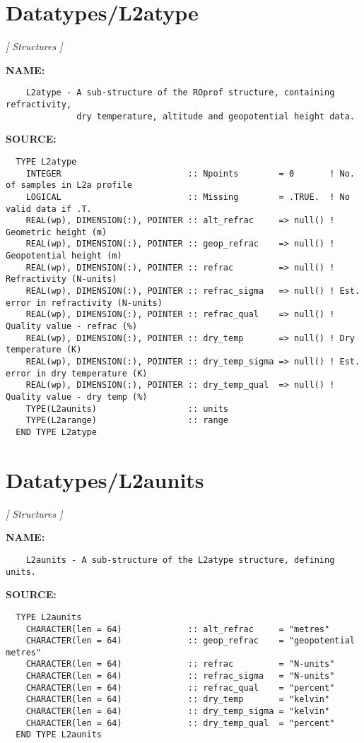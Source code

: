 \section{Datatypes/L2atype}
\textsl{[ Structures ]}

\label{ch:robo38}
\label{ch:Datatypes_L2atype}
\textbf{NAME:}\hspace{0.08in}\begin{Verbatim}
    L2atype - A sub-structure of the ROprof structure, containing refractivity, 
              dry temperature, altitude and geopotential height data.
\end{Verbatim}
\textbf{SOURCE:}\hspace{0.08in}\begin{Verbatim}
  TYPE L2atype
    INTEGER                         :: Npoints        = 0       ! No. of samples in L2a profile
    LOGICAL                         :: Missing        = .TRUE.  ! No valid data if .T.
    REAL(wp), DIMENSION(:), POINTER :: alt_refrac     => null() ! Geometric height (m)
    REAL(wp), DIMENSION(:), POINTER :: geop_refrac    => null() ! Geopotential height (m)
    REAL(wp), DIMENSION(:), POINTER :: refrac         => null() ! Refractivity (N-units)
    REAL(wp), DIMENSION(:), POINTER :: refrac_sigma   => null() ! Est. error in refractivity (N-units)
    REAL(wp), DIMENSION(:), POINTER :: refrac_qual    => null() ! Quality value - refrac (%)
    REAL(wp), DIMENSION(:), POINTER :: dry_temp       => null() ! Dry temperature (K)
    REAL(wp), DIMENSION(:), POINTER :: dry_temp_sigma => null() ! Est. error in dry temperature (K)
    REAL(wp), DIMENSION(:), POINTER :: dry_temp_qual  => null() ! Quality value - dry temp (%)
    TYPE(L2aunits)                  :: units
    TYPE(L2arange)                  :: range
  END TYPE L2atype
\end{Verbatim}
\section{Datatypes/L2aunits}
\textsl{[ Structures ]}

\label{ch:robo39}
\label{ch:Datatypes_L2aunits}
\textbf{NAME:}\hspace{0.08in}\begin{Verbatim}
    L2aunits - A sub-structure of the L2atype structure, defining units.
\end{Verbatim}
\textbf{SOURCE:}\hspace{0.08in}\begin{Verbatim}
  TYPE L2aunits
    CHARACTER(len = 64)             :: alt_refrac     = "metres"
    CHARACTER(len = 64)             :: geop_refrac    = "geopotential metres"
    CHARACTER(len = 64)             :: refrac         = "N-units"
    CHARACTER(len = 64)             :: refrac_sigma   = "N-units"
    CHARACTER(len = 64)             :: refrac_qual    = "percent"
    CHARACTER(len = 64)             :: dry_temp       = "kelvin"
    CHARACTER(len = 64)             :: dry_temp_sigma = "kelvin"
    CHARACTER(len = 64)             :: dry_temp_qual  = "percent"
  END TYPE L2aunits
\end{Verbatim}
